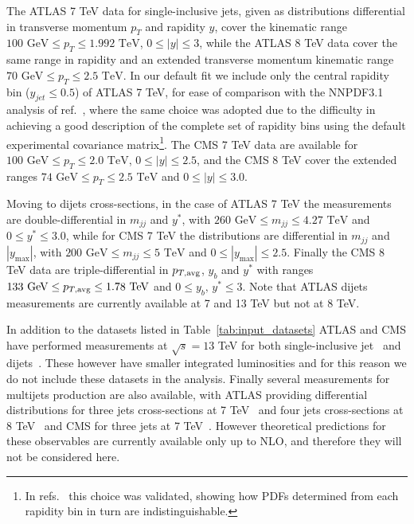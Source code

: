 %
The ATLAS 7 TeV data for single-inclusive jets, given as distributions differential in transverse momentum 
$p_T$ and rapidity $y$, cover the kinematic range $100\,\, \text{GeV} \leq p_T \leq 1.992\,\, \text{TeV}$,
$0 \leq |y| \leq 3$, while the ATLAS 8 TeV data cover the same range in rapidity and an extended transverse momentum
kinematic range $70\,\, \text{GeV} \leq p_T \leq 2.5\,\, \text{TeV}$.
In our default fit we include only the central rapidity bin ($y_{jet} \leq 0.5$) of ATLAS 7 TeV, 
for ease of comparison with the NNPDF3.1 analysis of ref.~\cite{Ball:2017nwa}, where the same choice was adopted due to
the difficulty in achieving a good description of the complete set of rapidity bins using
the default experimental covariance matrix\footnote{In refs.~\cite{Ball:2017nwa,Nocera:2017zge} this choice was validated,
showing how PDFs determined from each rapidity bin in turn are indistinguishable.}.
The CMS 7 TeV data are available for $100\,\, \text{GeV} \leq p_T \leq 2.0\,\, \text{TeV}$,
$0 \leq |y| \leq 2.5$, and the CMS 8 TeV cover the extended
ranges $74\,\, \text{GeV} \leq p_T \leq 2.5\,\, \text{TeV}$ and $0 \leq |y| \leq 3.0$.

%
Moving to dijets cross-sections, in the case of ATLAS 7 TeV the measurements are double-differential in
$m_{jj}$ and $y^*$, with
$260\,\,\text{GeV}\leq m_{jj} \leq 4.27\,\,\text{TeV}$ and $0 \leq y^* \leq 3.0$, while for CMS 7 TeV
the distributions are differential in  $m_{jj}$ and $|y_{\text{max}}|$, with
$200\,\,\text{GeV}\leq m_{jj} \leq 5\,\,\text{TeV}$ and $0 \leq |y_{\text{max}}| \leq 2.5$.  
Finally the CMS 8 TeV data are triple-differential in $p_{T,\rm avg}$, $y_b$ and $y^*$ with
ranges $133\,\,\text{GeV} \leq p_{T,\rm avg} \leq 1.78\,\,\text{TeV}$ and $0\leq y_b,\,y^* \leq 3$.
Note that ATLAS dijets measurements are currently available at 7 and 13 TeV but not at 8 TeV.

%
In addition to the datasets listed in Table~\ref{tab:input_datasets} ATLAS and CMS have performed
measurements at $\sqrt{s}=13$ TeV for both single-inclusive jet~\cite{Aaboud:2017wsi,Khachatryan:2016wdh}
and dijets~\cite{Aaboud:2017wsi,Sirunyan:2020uoj}. These however have smaller integrated luminosities and for this reason
we do not include these datasets in the analysis. 
%
Finally several measurements for multijets production are also available, with ATLAS providing differential distributions for
three jets cross-sections at 7 TeV~\cite{Aad:2014rma} and four jets cross-sections at 8 TeV~\cite{Aad:2015nda} 
and CMS for three jets at 7 TeV~\cite{CMS:2014mna}.
However theoretical predictions for these observables are currently available only up to NLO, and therefore they will
not be considered here.

